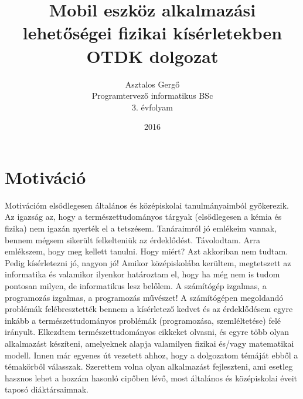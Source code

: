 \documentclass{thesis-ekf}
\institute{}
\title{Mobil eszköz alkalmazási lehetőségei fizikai kísérletekben\\
	OTDK dolgozat}
\author{Asztalos Gergő\\ Programtervező informatikus BSc \\
	 3. évfolyam}
\date{2016}
\theoremstyle{definition}
\theoremstyle{remark}
\begin{document}
\maketitle
\tableofcontents

\chapter*{Motiváció}

\begin{quotation}
\begin{flushright}
			\it{ ,,Hallom - elfelejtem.\\Látom - emlékszem.\\Csinálom - megértem.''	\\
				Confucius
		\end{flushright}
\end{quotation}
 Motivációm elsődlegesen általános és középiskolai tanulmányaimból gyökerezik. Az igazság az, hogy a természettudományos tárgyak (elsődlegesen a kémia és fizika) nem igazán nyerték el a tetszésem.
 Tanáraimról jó emlékeim vannak, bennem mégsem sikerült felkelteniük az érdeklődést. Távolodtam. 
 Arra emlékszem, hogy meg kellett tanulni. Hogy miért? Azt akkoriban nem tudtam. Pedig kísérletezni jó, nagyon jó! Amikor középiskolába kerültem, megtetszett az informatika és valamikor ilyenkor határoztam el, hogy ha még nem is tudom pontosan milyen, de informatikus lesz belőlem. A számítógép izgalmas, a programozás izgalmas, a programozás művészet! A számítógépen megoldandó problémák felébresztették bennem a kísérletező kedvet és az érdeklődésem egyre inkább a természettudományos problémák (programozása, szemléltetése) felé irányult. Elkezdtem természettudományos cikkeket olvasni, és egyre több olyan alkalmazást készíteni, amelyeknek alapja valamilyen fizikai és/vagy matematikai modell. Innen már egyenes út vezetett ahhoz, hogy a dolgozatom témáját ebből a témakörből válasszak. Szerettem volna olyan alkalmazást fejleszteni, ami esetleg hasznos lehet a hozzám hasonló cipőben lévő, most általános és középiskolai éveit taposó diáktársaimnak.         
\end{document}

